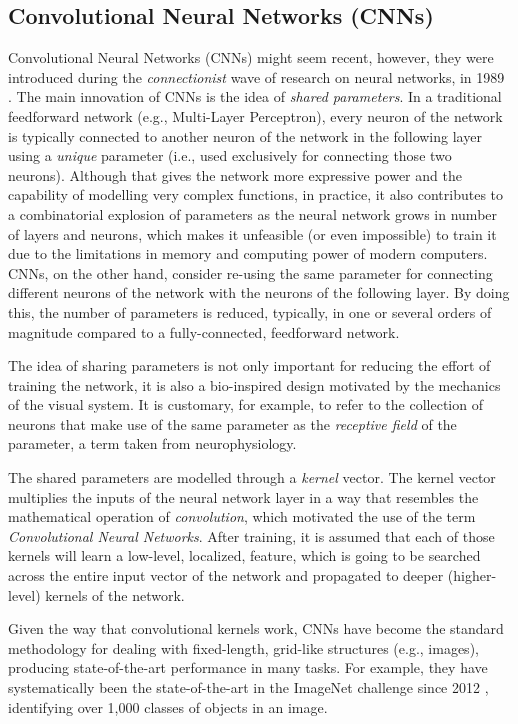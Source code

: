 \subsection{Convolutional Neural Networks (CNNs)}
Convolutional Neural Networks (CNNs) might seem recent, however, they were introduced during the \emph{connectionist} wave of research on neural networks, in 1989 \cite{lecun_generalization_1989, le_cun_handwritten_1989}. The main innovation of CNNs is the idea of \emph{shared parameters}. In a traditional feedforward network (e.g., Multi-Layer Perceptron), every neuron of the network is typically connected to another neuron of the network in the following layer using a \emph{unique} parameter (i.e., used exclusively for connecting those two neurons). Although that gives the network more expressive power and the capability of modelling very complex functions, in practice, it also contributes to a combinatorial explosion of parameters as the neural network grows in number of layers and neurons, which makes it unfeasible (or even impossible) to train it due to the limitations in memory and computing power of modern computers. CNNs, on the other hand, consider re-using the same parameter for connecting different neurons of the network with the neurons of the following layer. By doing this, the number of parameters is reduced, typically, in one or several orders of magnitude compared to a fully-connected, feedforward network.

The idea of sharing parameters is not only important for reducing the effort of training the network, it is also a bio-inspired design motivated by the mechanics of the visual system. It is customary, for example, to refer to the collection of neurons that make use of the same parameter as the \emph{receptive field} of the parameter, a term taken from neurophysiology. 

The shared parameters are modelled through a \emph{kernel} vector. The kernel vector multiplies the inputs of the neural network layer in a way that resembles the mathematical operation of \emph{convolution}, which motivated the use of the term \emph{Convolutional Neural Networks}. After training, it is assumed that each of those kernels will learn a low-level, localized, feature, which is going to be searched across the entire input vector of the network and propagated to deeper (higher-level) kernels of the network.

Given the way that convolutional kernels work, CNNs have become the standard methodology for dealing with fixed-length, grid-like structures (e.g., images), producing state-of-the-art performance in many tasks. For example, they have systematically been the state-of-the-art in the ImageNet challenge since 2012 \cite{krizhevsky_imagenet_2012}, identifying over 1,000 classes of objects in an image.

